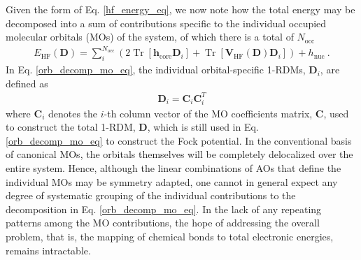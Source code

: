 \documentclass[journal=jctc,manuscript=article]{achemso}
\DeclareMathOperator{\tr}{Tr}
\begin{document}
Given the form of Eq. \ref{hf_energy_eq}, we now note how the total energy may be decomposed into a sum of contributions specific to the individual occupied molecular orbitals (MOs) of the system, of which there is a total of $N_{\text{occ}}$
%
\begin{align}
E_{\text{HF}}(\bm{D}) = \sum^{N_{\text{occ}}}_{i}(2\tr[\bm{h}_{\text{core}}\bm{D}_i] + \tr[\bm{V}_{\text{HF}}(\bm{D})\bm{D}_i]) + h_{\text{nuc}} \ . \label{orb_decomp_mo_eq}
\end{align}
%
In Eq. \ref{orb_decomp_mo_eq}, the individual orbital-specific 1-RDMs, $\bm{D}_i$, are defined as
%
\begin{align}
\bm{D}_i = \bm{C}_{i}\bm{C}^T_{i} \label{orb_spec_1rdm_eq}
\end{align}
%
where $\bm{C}_i$ denotes the $i$-th column vector of the MO coefficients matrix, $\bm{C}$, used to construct the total 1-RDM, $\bm{D}$, which is still used in Eq. \ref{orb_decomp_mo_eq} to construct the Fock potential. In the conventional basis of canonical MOs, the orbitals themselves will be completely delocalized over the entire system. Hence, although the linear combinations of AOs that define the individual MOs may be symmetry adapted, one cannot in general expect any degree of systematic grouping of the individual contributions to the decomposition in Eq. \ref{orb_decomp_mo_eq}. In the lack of any repeating patterns among the MO contributions, the hope of addressing the overall problem, that is, the mapping of chemical bonds to total electronic energies, remains intractable.\\
\end{document}
